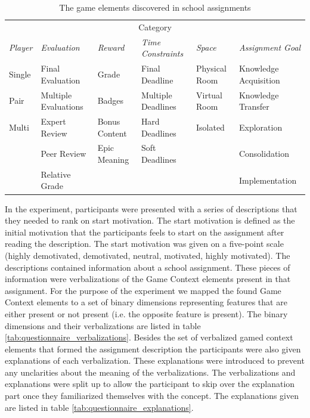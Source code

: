 \documentclass[11pt]{article}
\newcommand{\ra}[1]{\renewcommand{\arraystretch}{#1}}
\begin{document}
\begin{table}[h!t]\centering
\ra{1.3}
\footnotesize
\begin{tabular}{@{}*{6}{l @{\hspace{0.5em}} }@{}}
\toprule
\multicolumn{6}{c}{Category}  \\
\emph{Player} & \emph{Evaluation} & \emph{Reward} & \emph{Time Constraints} & \emph{Space} & \emph{Assignment Goal} \\
 \cmidrule(r){1-1} \cmidrule(r){2-2} \cmidrule(r){3-3} \cmidrule(r){4-4} \cmidrule(r){5-5} \cmidrule(r){6-6}
Single & Final Evaluation & Grade & Final Deadline & Physical Room & Knowledge Acquisition \\
Pair & Multiple Evaluations & Badges 	& Multiple Deadlines & Virtual Room & Knowledge Transfer \\
Multi & Expert Review 		& Bonus Content & Hard Deadlines & Isolated & Exploration \\
      & Peer Review 		& Epic Meaning	& Soft Deadlines & & Consolidation \\
      & Relative Grade 		&		& & &Implementation \\
\bottomrule
\end{tabular}
\caption{The game elements discovered in school assignments\label{tab:game_elements_assignments}}
\end{table}
In the experiment, participants were presented with a series of descriptions that they needed to rank on start motivation. The start motivation is defined as the initial motivation that the participants feels to start on the assignment after reading the description. The start motivation was given on a five-point scale (highly demotivated, demotivated, neutral, motivated, highly motivated). The descriptions contained information about a school assignment. These pieces of information were verbalizations of the Game Context elements present in that assignment. For the purpose of the experiment we mapped the found Game Context elements to a set of binary dimensions representing features that are either present or not present (i.e. the opposite feature is present). The binary dimensions and their verbalizations are listed in table \ref{tab:questionnaire_verbalizations}. Besides the set of verbalized gamed context elements that formed the assignment description the participants were also given explanations of each 
verbalization. These explanations were introduced to prevent any unclarities about the meaning of the verbalizations. The verbalizations and explanations were split up to allow the participant to skip over the explanation part once they familiarized themselves with the concept. The explanations given are listed in table \ref{tab:questionnaire_explanations}.
\end{document}
